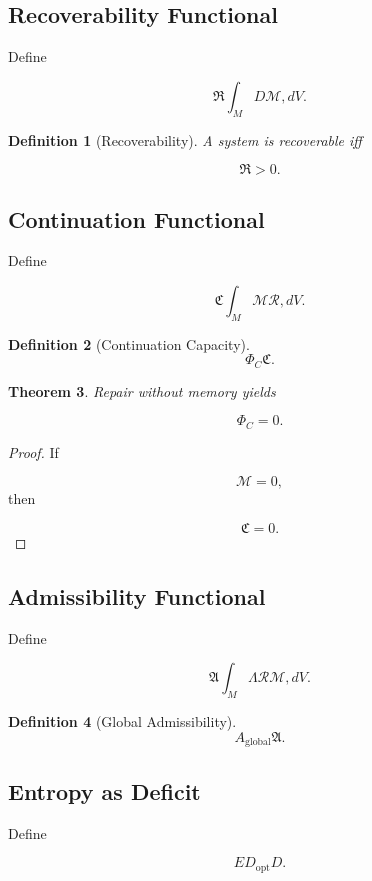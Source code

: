 \documentclass[12pt]{article}
\newtheorem{theorem}{Theorem}[section]
\newtheorem{definition}[theorem]{Definition}
\theoremstyle{remark}
\begin{document}
\subsection{Recoverability Functional}

Define

\[
\mathfrak R
\int_M
D\mathcal M
,dV.
\]

\begin{definition}[Recoverability]
A system is recoverable iff

\[
\mathfrak R>0.
\]
\end{definition}
\subsection{Continuation Functional}

Define

\[
\mathfrak C
\int_M
\mathcal M\mathcal R
,dV.
\]

\begin{definition}[Continuation Capacity]
\[
\Phi_C
\mathfrak C.
\]
\end{definition}

\begin{theorem}
Repair without memory yields

\[
\Phi_C=0.
\]
\end{theorem}
\begin{proof}
If

\[
\mathcal M=0,
\]
then

\[
\mathfrak C=0.
\]
\end{proof}
\subsection{Admissibility Functional}

Define

\[
\mathfrak A
\int_M
\Lambda
\mathcal R
\mathcal M
,dV.
\]

\begin{definition}[Global Admissibility]
\[
A_{\mathrm{global}}
\mathfrak A.
\]
\end{definition}

\subsection{Entropy as Deficit}

Define

\[
E
D_{\mathrm{opt}}

D.
\]
\end{document}
